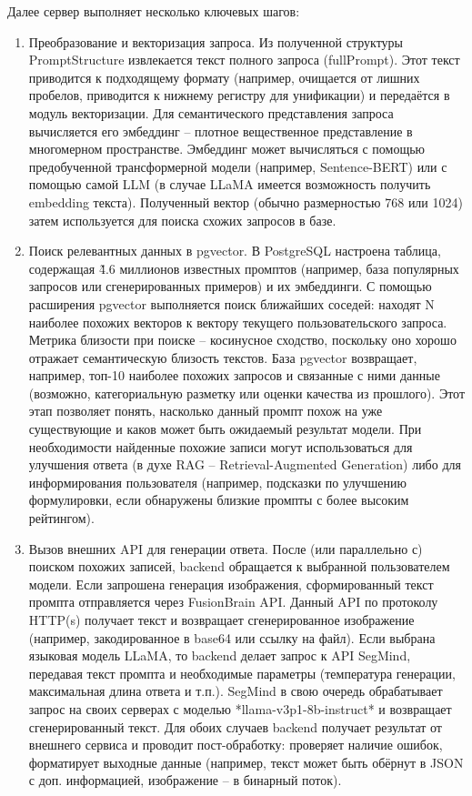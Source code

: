 Далее сервер выполняет несколько ключевых шагов:
\begin{enumerate}[label=\arabic*.]
\item Преобразование и векторизация запроса. Из полученной структуры PromptStructure извлекается текст полного запроса (fullPrompt). Этот текст приводится к подходящему формату (например, очищается от лишних пробелов, приводится к нижнему регистру для унификации) и передаётся в модуль векторизации. Для семантического представления запроса вычисляется его эмбеддинг – плотное вещественное представление в многомерном пространстве. Эмбеддинг может вычисляться с помощью предобученной трансформерной модели (например, Sentence-BERT) или с помощью самой LLM (в случае LLaMA имеется возможность получить embedding текста). Полученный вектор (обычно размерностью 768 или 1024) затем используется для поиска схожих запросов в базе.

\item Поиск релевантных данных в pgvector. В PostgreSQL настроена таблица, содержащая \~4.6 миллионов известных промптов (например, база популярных запросов или сгенерированных примеров) и их эмбеддинги. С помощью расширения pgvector выполняется поиск ближайших соседей: находят N наиболее похожих векторов к вектору текущего пользовательского запроса. Метрика близости при поиске – косинусное сходство, поскольку оно хорошо отражает семантическую близость текстов. База pgvector возвращает, например, топ-10 наиболее похожих запросов и связанные с ними данные (возможно, категориальную разметку или оценки качества из прошлого). Этот этап позволяет понять, насколько данный промпт похож на уже существующие и каков может быть ожидаемый результат модели. При необходимости найденные похожие записи могут использоваться для улучшения ответа (в духе RAG – Retrieval-Augmented Generation) либо для информирования пользователя (например, подсказки по улучшению формулировки, если обнаружены близкие промпты с более высоким рейтингом).

\item Вызов внешних API для генерации ответа. После (или параллельно с) поиском похожих записей, backend обращается к выбранной пользователем модели. Если запрошена генерация изображения, сформированный текст промпта отправляется через FusionBrain API. Данный API по протоколу HTTP(s) получает текст и возвращает сгенерированное изображение (например, закодированное в base64 или ссылку на файл). Если выбрана языковая модель LLaMA, то backend делает запрос к API SegMind, передавая текст промпта и необходимые параметры (температура генерации, максимальная длина ответа и т.п.). SegMind в свою очередь обрабатывает запрос на своих серверах с моделью *llama-v3p1-8b-instruct* и возвращает сгенерированный текст. Для обоих случаев backend получает результат от внешнего сервиса и проводит пост-обработку: проверяет наличие ошибок, форматирует выходные данные (например, текст может быть обёрнут в JSON с доп. информацией, изображение – в бинарный поток).


\end{enumerate}

